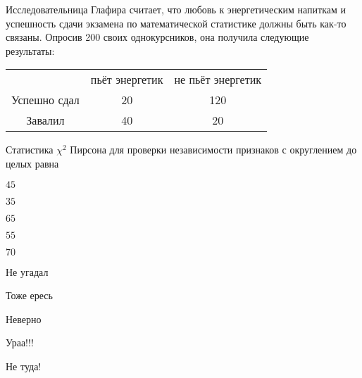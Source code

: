 
\begin{question}
Исследовательница Глафира считает, что любовь к энергетическим напиткам
и успешность сдачи экзамена по математической статистике должны быть
как-то связаны. Опросив 200 своих однокурсников, она получила следующие
результаты:

\begin{tabular}{ccc}
\toprule
 & пьёт энергетик & не пьёт энергетик \\
Успешно сдал & 20 & 120 \\
Завалил  & 40 & 20 \\
\bottomrule
\end{tabular}

Статистика \(\chi^2\) Пирсона для проверки независимости признаков с
округлением до целых равна
\begin{answerlist}
  \item \(45\)
  \item \(35\)
  \item \(65\)
  \item \(55\)
  \item \(70\)
\end{answerlist}
\end{question}

\begin{solution}
\begin{answerlist}
  \item Не угадал
  \item Тоже ересь
  \item Неверно
  \item Ураа!!!
  \item Не туда!
\end{answerlist}
\end{solution}

